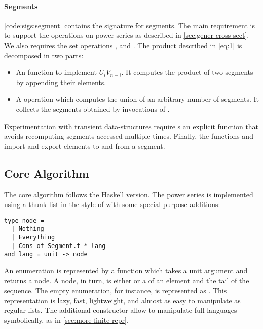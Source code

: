 \paragraph{Segments}

\autoref{code:sigs:segment} contains the signature for segments.
The main requirement is to support the operations on power series as described in \autoref{sec:gener-cross-sect}.
We also requires the set operations
,  and .
%
The product described in \autoref{eq:1} is decomposed in two parts:
\begin{itemize}[leftmargin=*]
\item An  function to implement $U_i V_{n-i}$. It computes the
  product of two segments by appending their elements.
\item A  operation which computes the union of an arbitrary number
  of segments. It collects the segments obtained
  by invocations of .
\end{itemize}
%
Experimentation with transient data-structures require s
an explicit  function that avoids recomputing segments accessed
multiple times. 
%
Finally, the functions   and  import and
export elements to and from a segment.

\subsection{Core Algorithm}

The core algorithm follows the Haskell version. The power series
is implemented using a thunk list in the style of \citet{DBLP:conf/cpp/Pottier17}
with some special-purpose additions:

\begin{lstlisting}
type node =
  | Nothing
  | Everything
  | Cons of Segment.t * lang
and lang = unit -> node
\end{lstlisting}

An enumeration is represented by a function which takes a unit argument and returns
a node. A node, in turn, is either  or a  of an
element and the tail of the sequence. The empty enumeration, for instance, is
represented as .
This representation is lazy, fast, lightweight, and almost as easy to
manipulate as regular lists.
The additional constructor  allow to manipulate
full languages symbolically, as in \cref{sec:more-finite-repr}.


